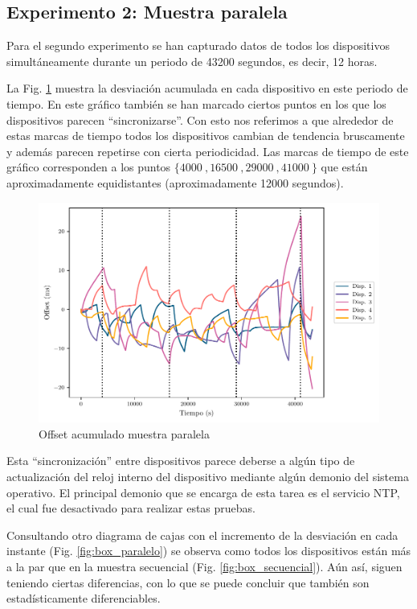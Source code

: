 \subsection{Experimento 2: Muestra paralela}

Para el segundo experimento se han capturado datos de todos los dispositivos simultáneamente durante un periodo de \SI{43200}{} segundos, es decir, \SI{12}{} horas.

La Fig. \ref{fig:off_acu_paralelo} muestra la desviación acumulada en cada dispositivo en este periodo de tiempo. En este gráfico también se han marcado ciertos puntos en los que los dispositivos parecen ``sincronizarse''. Con esto nos referimos a que alrededor de estas marcas de tiempo todos los dispositivos cambian de tendencia bruscamente y además parecen repetirse con cierta periodicidad. Las marcas de tiempo de este gráfico corresponden a los puntos $\{\SI{4000}{},  \SI{16500}{}, \SI{29000}{}, \SI{41000}{}\}$ que están aproximadamente equidistantes (aproximadamente \SI{12000}{} segundos).

\begin{figure}
    \centering
    \includegraphics[scale=0.65]{../Python/plots/parallel/offset_plot}
    \caption{Offset acumulado muestra paralela}
    \label{fig:off_acu_paralelo}
\end{figure}

Esta ``sincronización'' entre dispositivos parece deberse a algún tipo de actualización del reloj interno del dispositivo mediante algún demonio del sistema operativo. El principal demonio que se encarga de esta tarea es el servicio NTP, el cual fue desactivado para realizar estas pruebas. 

Consultando otro diagrama de cajas con el incremento de la desviación en cada instante (Fig. \ref{fig:box_paralelo}) se observa como todos los dispositivos están más a la par que en la muestra secuencial (Fig. \ref{fig:box_secuencial}). Aún así, siguen teniendo ciertas diferencias, con lo que se puede concluir que también son estadísticamente diferenciables.

